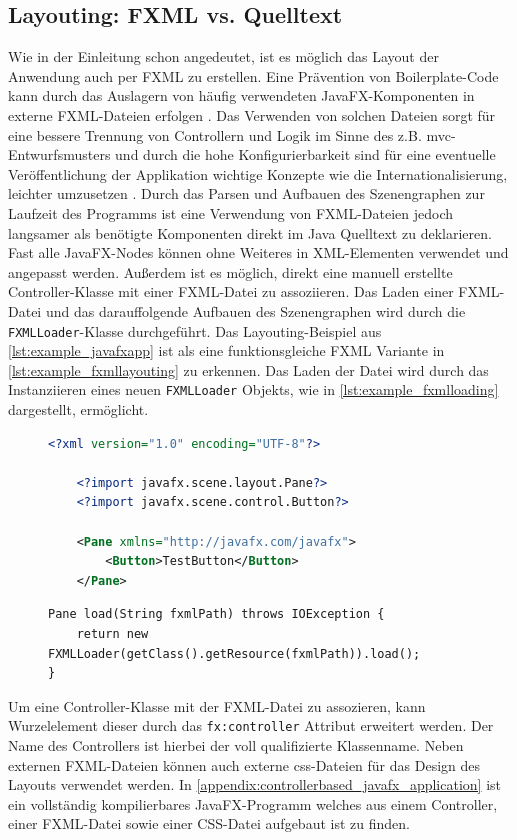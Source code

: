 \subsection{Layouting: FXML vs. Quelltext}
Wie in der Einleitung schon angedeutet, ist es möglich das Layout der Anwendung auch per FXML zu erstellen. Eine Prävention von Boilerplate-Code kann durch das Auslagern von häufig verwendeten JavaFX-Komponenten in externe FXML-Dateien erfolgen \cite{Kruk2018}. Das Verwenden von solchen Dateien sorgt für eine bessere Trennung von Controllern und Logik im Sinne des z.B. \ac{mvc}-Entwurfsmusters \cite{Juneau2013} und durch die hohe Konfigurierbarkeit sind für eine eventuelle Veröffentlichung der Applikation wichtige Konzepte wie die Internationalisierung, leichter umzusetzen \cite{Steyer2014}. Durch das Parsen und Aufbauen des Szenengraphen zur Laufzeit des Programms ist eine Verwendung von FXML-Dateien jedoch langsamer als benötigte Komponenten direkt im Java Quelltext zu deklarieren. Fast alle JavaFX-Nodes können ohne Weiteres in XML-Elementen verwendet und angepasst werden. Außerdem ist es möglich, direkt eine manuell erstellte Controller-Klasse mit einer FXML-Datei zu assoziieren. Das Laden einer FXML-Datei und das darauffolgende Aufbauen des Szenengraphen wird durch die \texttt{FXMLLoader}-Klasse durchgeführt. Das Layouting-Beispiel aus \autoref{lst:example_javafxapp} ist als eine funktionsgleiche FXML Variante in \autoref{lst:example_fxmllayouting} zu erkennen. Das Laden der Datei wird durch das Instanziieren eines neuen \texttt{FXMLLoader} Objekts, wie in \autoref{lst:example_fxmlloading} dargestellt, ermöglicht.

\begin{figure}[H]
	\begin{lstlisting}[caption={Beispiel -- FXML Layouting.}, captionpos=b, label=lst:example_fxmllayouting, language=XML]
	<?xml version="1.0" encoding="UTF-8"?>
	
	<?import javafx.scene.layout.Pane?>
	<?import javafx.scene.control.Button?>
	
	<Pane xmlns="http://javafx.com/javafx">
		<Button>TestButton</Button>
	</Pane>
	\end{lstlisting}
\end{figure}
\begin{figure}[H]
	\begin{lstlisting}[caption={Beispiel -- FXML Ladeprozess.}, captionpos=b, label=lst:example_fxmlloading]
Pane load(String fxmlPath) throws IOException {
	return new FXMLLoader(getClass().getResource(fxmlPath)).load();
}
	\end{lstlisting}
\end{figure}
\noindent Um eine Controller-Klasse mit der FXML-Datei zu assozieren, kann Wurzelelement dieser durch das \texttt{fx:controller} Attribut erweitert werden. Der Name des Controllers ist hierbei der voll qualifizierte Klassenname. Neben externen FXML-Dateien können auch externe \ac{css}-Dateien für das Design des Layouts verwendet werden. In \autoref{appendix:controllerbased_javafx_application} ist ein vollständig kompilierbares JavaFX-Programm welches aus einem Controller, einer FXML-Datei sowie einer CSS-Datei aufgebaut ist zu finden.
